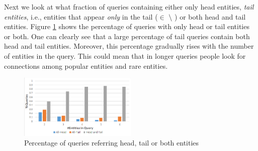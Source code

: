 Next we look at what fraction of queries containing either only head entities, \emph{tail entities}, i.e., entities 
that appear \emph{only} in the tail ($\in$ \etail{} $\setminus$ \ehead{})
or both head and tail entities. Figure \ref{img:headTailEntPercent} shows the percentage of 
queries with only head or tail entities or both. One can clearly see that a large percentage of tail 
queries contain both head and tail entities. Moreover, this percentage gradually rises with the 
number of entities in the query. This could mean that in longer queries people look
for connections among popular entities and rare entities. 

\begin{figure}
\label{img:headTailEntPercent}
  \centering
    \includegraphics[width = 0.5\textwidth]{images/entity-head-tail-count.png}
	
	\caption{Percentage of queries referring head, tail or both entities}
	
\end{figure}
 

